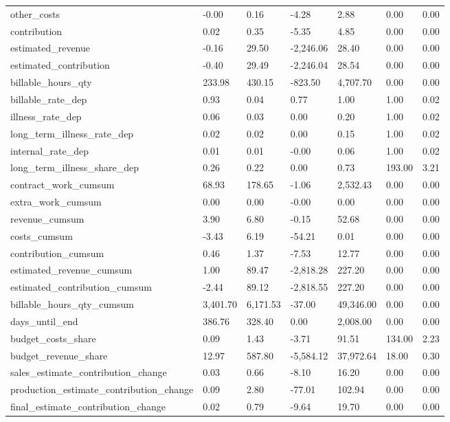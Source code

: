\begin{landscape}
\begin{longtable}[h!]{lllllll}
other_costs & -0.00 & 0.16 & -4.28 & 2.88 & 0.00 & 0.00 \\
contribution & 0.02 & 0.35 & -5.35 & 4.85 & 0.00 & 0.00 \\
estimated_revenue & -0.16 & 29.50 & -2,246.06 & 28.40 & 0.00 & 0.00 \\
estimated_contribution & -0.40 & 29.49 & -2,246.04 & 28.54 & 0.00 & 0.00 \\
billable_hours_qty & 233.98 & 430.15 & -823.50 & 4,707.70 & 0.00 & 0.00 \\
billable_rate_dep & 0.93 & 0.04 & 0.77 & 1.00 & 1.00 & 0.02 \\
illness_rate_dep & 0.06 & 0.03 & 0.00 & 0.20 & 1.00 & 0.02 \\
long_term_illness_rate_dep & 0.02 & 0.02 & 0.00 & 0.15 & 1.00 & 0.02 \\
internal_rate_dep & 0.01 & 0.01 & -0.00 & 0.06 & 1.00 & 0.02 \\
long_term_illness_share_dep & 0.26 & 0.22 & 0.00 & 0.73 & 193.00 & 3.21 \\
contract_work_cumsum & 68.93 & 178.65 & -1.06 & 2,532.43 & 0.00 & 0.00 \\
extra_work_cumsum & 0.00 & 0.00 & -0.00 & 0.00 & 0.00 & 0.00 \\
revenue_cumsum & 3.90 & 6.80 & -0.15 & 52.68 & 0.00 & 0.00 \\
costs_cumsum & -3.43 & 6.19 & -54.21 & 0.01 & 0.00 & 0.00 \\
contribution_cumsum & 0.46 & 1.37 & -7.53 & 12.77 & 0.00 & 0.00 \\
estimated_revenue_cumsum & 1.00 & 89.47 & -2,818.28 & 227.20 & 0.00 & 0.00 \\
estimated_contribution_cumsum & -2.44 & 89.12 & -2,818.55 & 227.20 & 0.00 & 0.00 \\
billable_hours_qty_cumsum & 3,401.70 & 6,171.53 & -37.00 & 49,346.00 & 0.00 & 0.00 \\
days_until_end & 386.76 & 328.40 & 0.00 & 2,008.00 & 0.00 & 0.00 \\
budget_costs_share & 0.09 & 1.43 & -3.71 & 91.51 & 134.00 & 2.23 \\
budget_revenue_share & 12.97 & 587.80 & -5,584.12 & 37,972.64 & 18.00 & 0.30 \\
sales_estimate_contribution_change & 0.03 & 0.66 & -8.10 & 16.20 & 0.00 & 0.00 \\
production_estimate_contribution_change & 0.09 & 2.80 & -77.01 & 102.94 & 0.00 & 0.00 \\
final_estimate_contribution_change & 0.02 & 0.79 & -9.64 & 19.70 & 0.00 & 0.00 \\

\end{longtable}
\end{landscape}
